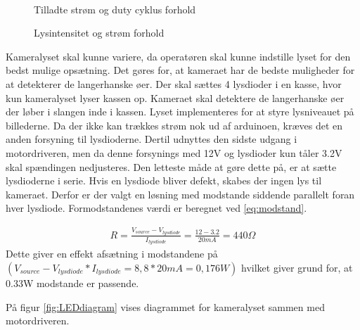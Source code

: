 \begin{figure}[htbp]
\begin{minipage}[b]{0.48\textwidth}
\end{minipage} \\ %
\begin{minipage}[t]{0.48\textwidth}
\caption{Tilladte strøm og duty cyklus forhold} %
\label{fig:LED1}
\end{minipage} \hfill
\begin{minipage}[t]{0.48\textwidth}
\caption{Lysintensitet og strøm forhold} %
\label{fig:LED2}
\end{minipage}
\end{figure}

 Kameralyset skal kunne variere, da operatøren skal kunne indstille lyset for den bedst mulige opsætning. Det gøres for, at kameraet har de bedste muligheder for at detekterer de langerhanske øer. Der skal sættes 4 lysdioder i en kasse, hvor kun kameralyset lyser kassen op. Kameraet skal detektere de langerhanske øer der løber i slangen inde i kassen. Lyset implementeres for at styre lysniveauet på billederne. Da der ikke kan trækkes strøm nok ud af arduinoen, kræves det en anden forsyning til lysdioderne. Dertil udnyttes den sidste udgang i motordriveren, men da denne forsynings med 12V og lysdioder kun tåler 3.2V skal spændingen nedjusteres. Den letteste måde at gøre dette på, er at sætte lysdioderne i serie. Hvis en lysdiode bliver defekt, skabes der ingen lys til kameraet. Derfor er der valgt en løsning med modstande siddende parallelt foran hver lysdiode. Formodstandenes værdi er beregnet ved \ref{eq:modstand}. 

\begin{align}
R=\frac{V_{source}-V_{lysdiode}}{I_{lysdiode}}=\frac{12-3.2}{20mA}=440\Omega
\label{eq:modstand}
\end{align} 
Dette giver en effekt afsætning i modstandene på $(V_{source}-V_{lysdiode}*I_{lysdiode}=8,8*20mA=0,176W)$ hvilket giver grund for, at 0.33W modstande er passende.

På figur \ref{fig:LEDdiagram} vises diagrammet for kameralyset sammen med motordriveren.
 
